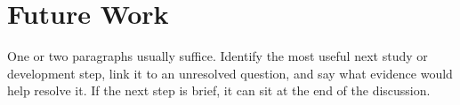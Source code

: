 \chapter{Future Work}
\label{chap:future-work}

One or two paragraphs usually suffice. Identify the most useful next study or development step, link it to an unresolved question, and say what evidence would help resolve it. If the next step is brief, it can sit at the end of the discussion.